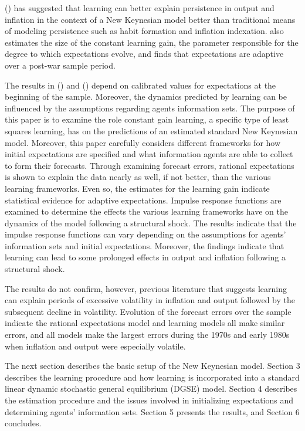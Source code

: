 \documentclass[11pt]{article}
\newcommand{\citee}[1]{\citeauthor*{#1} (\citeyear{#1})}
\begin{document}
\citee{milani2007} has suggested that learning can better explain persistence in output and inflation in the context of a New Keynesian model better than traditional means of modeling persistence such as habit formation and inflation indexation.  \citeauthor*{milani2007} also estimates the size of the constant learning gain, the parameter responsible for the degree to which expectations evolve, and finds that expectations are adaptive over a post-war sample period.  

The results in \citee{milani2007} and \citee{primiceri2006} depend on calibrated values for expectations at the beginning of the sample.  Moreover, the dynamics predicted by learning can be influenced by the assumptions regarding agents information sets.  The purpose of this paper is to examine the role constant gain learning, a specific type of least squares learning, has on the predictions of an estimated standard New Keynesian model.  Moreover, this paper carefully considers different frameworks for how initial expectations are specified and what information agents are able to collect to form their forecasts.  Through examining forecast errors, rational expectations is shown to explain the data nearly as well, if not better, than the various learning frameworks.   Even so, the estimates for the learning gain indicate statistical evidence for adaptive expectations.  Impulse response functions are examined to determine the effects the various learning frameworks have on the dynamics of the model following a structural shock.  The results indicate that the impulse response functions can vary depending on the assumptions for agents' information sets and initial expectations.  Moreover, the findings indicate that learning can lead to some prolonged effects in output and inflation following a structural shock.

The results do not confirm, however, previous literature that suggests learning can explain periods of excessive volatility in inflation and output followed by the subsequent decline in volatility.  Evolution of the forecast errors over the sample indicate the rational expectations model and learning models all make similar errors, and all models make the largest errors during the 1970s and early 1980s when inflation and output were especially volatile.

The next section describes the basic setup of the New Keynesian model.  Section 3 describes the learning procedure and how learning is incorporated into a standard linear dynamic stochastic general equilibrium (DGSE) model.  Section 4 describes the estimation procedure and the issues involved in initializing expectations and determining agents' information sets.  Section 5 presents the results, and Section 6 concludes.
\end{document}
